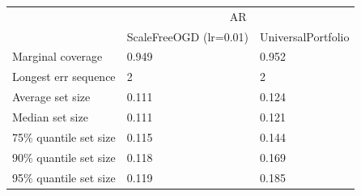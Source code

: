 \begin{tabular}{lll}
\toprule
& \multicolumn{2}{c}{AR} \\
& ScaleFreeOGD (lr=0.01) & UniversalPortfolio \\
\midrule
Marginal coverage & 0.949 & 0.952 \\
Longest err sequence & 2 & 2 \\
Average set size & 0.111 & 0.124 \\
Median set size & 0.111 & 0.121 \\
75\% quantile set size & 0.115 & 0.144 \\
90\% quantile set size & 0.118 & 0.169 \\
95\% quantile set size & 0.119 & 0.185 \\
\bottomrule
\end{tabular}
